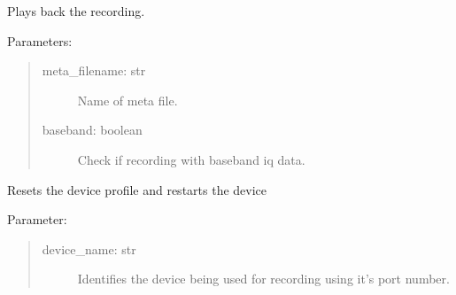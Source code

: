 \documentclass[letterpaper,10pt,english]{sphinxmanual}
\begin{document}
\begin{fulllineitems}
\label{\detokenize{X4 radar:X4_record_playback.playback_recording}}
Plays back the recording.

Parameters:
\begin{quote}
\begin{description}
\item[{meta\_filename: str}] \leavevmode
Name of meta file.

\item[{baseband: boolean}] \leavevmode
Check if recording with baseband iq data.

\end{description}
\end{quote}

\end{fulllineitems}


\begin{fulllineitems}
\label{\detokenize{X4 radar:X4_record_playback.reset}}
Resets the device profile and restarts the device

Parameter:
\begin{quote}
\begin{description}
\item[{device\_name: str}] \leavevmode
Identifies the device being used for recording using it’s port number.

\end{description}
\end{quote}

\end{fulllineitems}

\end{document}
